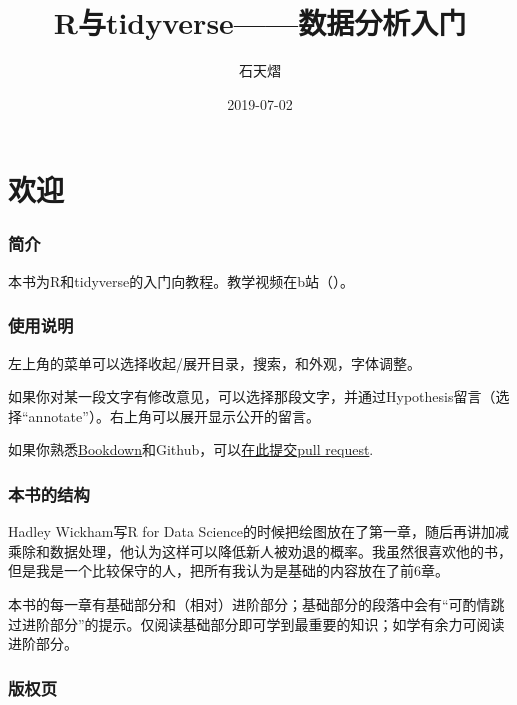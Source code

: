 \documentclass[]{book}
\title{R与tidyverse------数据分析入门}
\author{石天熠}
\date{2019-07-02}
\begin{document}
\maketitle

{
\setcounter{tocdepth}{1}
\tableofcontents
}
\hypertarget{welcome}{%
\chapter*{欢迎}\label{welcome}}

\hypertarget{ux7b80ux4ecb}{%
\subsection*{简介}\label{ux7b80ux4ecb}}

本书为R和tidyverse的入门向教程。教学视频在b站（）。

\hypertarget{ux8bf4ux660e}{%
\subsection*{使用说明}\label{ux8bf4ux660e}}

左上角的菜单可以选择收起/展开目录，搜索，和外观，字体调整。

如果你对某一段文字有修改意见，可以选择那段文字，并通过Hypothesis留言（选择``annotate''）。右上角可以展开显示公开的留言。

如果你熟悉\href{https://bookdown.org}{Bookdown}和Github，可以\href{https://github.com/TianyiShi2001/r-and-tidyverse-book}{在此提交pull request}.

\subsection{本书的结构}

Hadley Wickham写R for Data Science的时候把绘图放在了第一章，随后再讲加减乘除和数据处理，他认为这样可以降低新人被劝退的概率。我虽然很喜欢他的书，但是我是一个比较保守的人，把所有我认为是基础的内容放在了前6章。

本书的每一章有基础部分和（相对）进阶部分；基础部分的段落中会有``可酌情跳过进阶部分''的提示。仅阅读基础部分即可学到最重要的知识；如学有余力可阅读进阶部分。

\subsection*{版权页}
\end{document}
